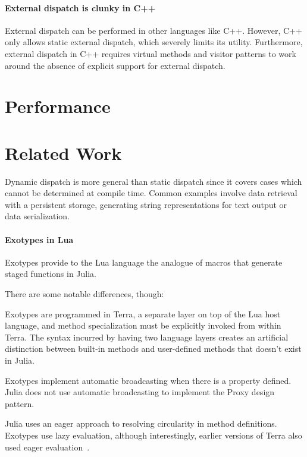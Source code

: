 \documentclass[pldi]{sigplanconf-pldi15}
\begin{document}
\paragraph{External dispatch is clunky in C++}
External dispatch can be performed in other languages like C++. However,
C++ only allows static external dispatch, which severely limits its utility.
Furthermore, external dispatch in C++ requires virtual methods and visitor
patterns\cite{designpatterns} to work around the absence of explicit support
for external dispatch.



\section{Performance}



\section{Related Work}

Dynamic dispatch is more general than static dispatch since it covers cases
which cannot be determined at compile time.  Common examples involve data
retrieval with a persistent storage, generating string representations for text
output or data serialization.\cite{Shields1998}

\paragraph{Exotypes in Lua}
Exotypes\cite{exotypes} provide to the Lua language\cite{lua} the analogue of
macros that generate staged functions\cite{stagedfunc} in Julia.

There are some notable differences, though:

Exotypes are programmed in Terra,\cite{terra} a separate layer on top of the
Lua host language, and method specialization must be explicitly invoked from
within Terra. The syntax incurred by having two language layers creates an
artificial distinction between built-in methods and user-defined methods that
doesn't exist in Julia.

Exotypes implement automatic broadcasting when there is a
 property defined. Julia does not use automatic
broadcasting to implement the Proxy design pattern.

Julia uses an eager approach to resolving circularity in method definitions.
Exotypes use lazy evaluation, although interestingly, earlier versions of Terra
also used eager evaluation~\cite{terra}.
\end{document}
